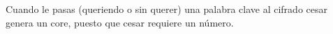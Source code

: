 
\begin{DoxyRefList}
\item[\label{bug__bug000001}%
\Hypertarget{bug__bug000001}%
File \hyperlink{cripto_8cc}{cripto.cc} ]Cuando le pasas (queriendo o sin querer) una palabra clave al cifrado cesar genera un core, puesto que cesar requiere un número. 
\end{DoxyRefList}